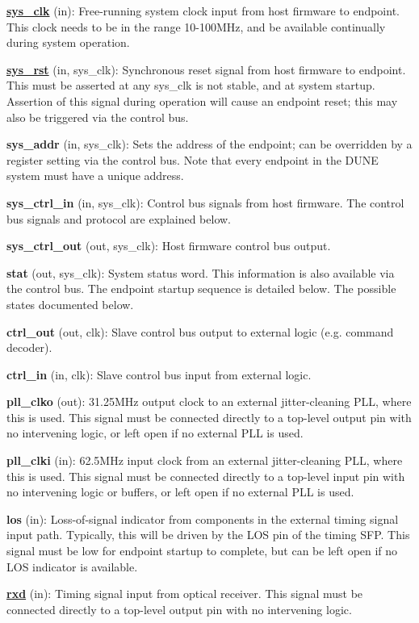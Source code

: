 \documentclass[fleqn,12pt,a4paper]{olplainarticle}
\begin{document}
\textbf{\uline{sys\_clk}} (in): Free-running system clock input from host firmware to endpoint. This clock needs to be in the range 10-100MHz, and be available continually during system operation.

\textbf{\uline{sys\_rst}} (in, sys\_clk): Synchronous reset signal from host firmware to endpoint. This must be asserted at any sys\_clk is not stable, and at system startup. Assertion of this signal during operation will cause an endpoint reset; this may also be triggered via the control bus.

\textbf{sys\_addr} (in, sys\_clk): Sets the address of the endpoint; can be overridden by a register setting via the control bus. Note that every endpoint in the DUNE system must have a unique address.

\textbf{sys\_ctrl\_in} (in, sys\_clk): Control bus signals from host firmware. The control bus signals and protocol are explained below.

\textbf{sys\_ctrl\_out} (out, sys\_clk): Host firmware control bus output.

\textbf{stat} (out, sys\_clk): System status word. This information is also available via the control bus. The endpoint startup sequence is detailed below. The possible states documented below.

\textbf{ctrl\_out} (out, clk): Slave control bus output to external logic (e.g. command decoder).

\textbf{ctrl\_in} (in, clk): Slave control bus input from external logic.

\textbf{pll\_clko} (out): 31.25MHz output clock to an external jitter-cleaning PLL, where this is used. This signal must be connected directly to a top-level output pin with no intervening logic, or left open if no external PLL is used.

\textbf{pll\_clki} (in): 62.5MHz input clock from an external jitter-cleaning PLL, where this is used. This signal must be connected directly to a top-level input pin with no intervening logic or buffers, or left open if no external PLL is used.

\textbf{los} (in): Loss-of-signal indicator from components in the external timing signal input path. Typically, this will be driven by the LOS pin of the timing SFP. This signal must be low for endpoint startup to complete, but can be left open if no LOS indicator is available.

\textbf{\uline{rxd}} (in): Timing signal input from optical receiver. This signal must be connected directly to a top-level output pin with no intervening logic.
\end{document}
